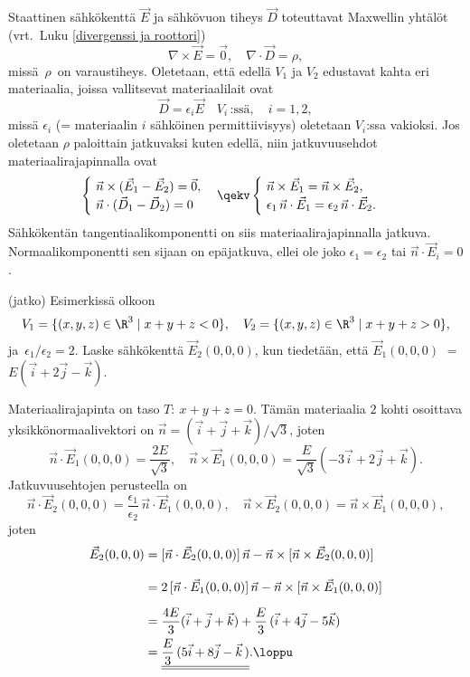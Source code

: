 \begin{Exa} Staattinen sähkökenttä $\vec E$ ja sähkövuon tiheys $\vec D$ toteuttavat Maxwellin
yhtälöt (vrt.\ Luku \ref{divergenssi ja roottori})
\[ 
\nabla\times\vec E = \vec 0, \quad \nabla\cdot\vec D = \rho, 
\]
missä $\,\rho\,$ on varaustiheys. Oletetaan, että edellä $V_1$ ja $V_2$ edustavat kahta eri 
materiaalia, joissa vallitsevat materiaalilait ovat
\[ 
\vec D = \epsilon_i\vec E \quad V_i\,\text{:ssä}, \quad i=1,2, 
\]
missä $\epsilon_i$ (= materiaalin $i$ sähköinen permittiivisyys) oletetaan $V_i$:ssa vakioksi.
Jos oletetaan $\rho$ paloittain jatkuvaksi kuten edellä, niin jatkuvuusehdot 
materiaalirajapinnalla ovat
\[
\begin{cases} 
\ \vec n\times(\vec E_1-\vec E_2) = \vec 0, \\ \ \vec n\cdot(\vec D_1-\vec D_2) = 0 
\end{cases}
\qekv \begin{cases} 
      \ \vec n\times\vec E_1 = \vec n\times\vec E_2, \\ 
      \ \epsilon_1\,\vec n\cdot\vec E_1 = \epsilon_2\,\vec n\cdot\vec E_2.
      \end{cases}
\]
Sähkökentän tangentiaalikomponentti on siis materiaalirajapinnalla jatkuva. Normaalikomponentti
sen sijaan on epäjatkuva, ellei ole joko $\epsilon_1 = \epsilon_2$ tai $\vec n\cdot\vec E_i=0$.
\loppu
\end{Exa}
\jatko \begin{Exa} (jatko) Esimerkissä olkoon 
\[ 
V_1 = \{(x,y,z) \in \R^3 \mid x+y+z<0\}, \quad V_2 = \{(x,y,z) \in \R^3 \mid x+y+z>0\}, 
\]
ja $\,\epsilon_1/\epsilon_2=2$. Laske sähkökenttä $\vec E_2(0,0,0)$, kun tiedetään, että 
$\vec E_1(0,0,0)$ $=$ $E(\vec i+2\vec j-\vec k)$.
\end{Exa}
\ratk Materiaalirajapinta on taso $T:\ x+y+z=0$. Tämän materiaalia $2$ kohti osoittava 
yksikkönormaalivektori on $\vec n = (\vec i+\vec j+\vec k)/\sqrt{3}$, joten
\[
\vec n\cdot\vec E_1(0,0,0) = \frac{2E}{\sqrt{3}}, \quad \vec n\times\vec E_1(0,0,0) 
                           = \frac{E}{\sqrt{3}}(-3\vec i+2\vec j+\vec k).
\]
Jatkuvuusehtojen perusteella on
\[ 
\vec n\cdot\vec E_2(0,0,0) = \frac{\epsilon_1}{\epsilon_2}\,\vec n\cdot\vec E_1(0,0,0), \quad
\vec n\times\vec E_2(0,0,0)=\vec n\times\vec E_1(0,0,0), 
\]
joten
\begin{align*}
\vec E_2(0,0,0) &=[\vec n\cdot\vec E_2(0,0,0)]\,\vec n
                            -\vec n\times[\vec n\times\vec E_2(0,0,0)] \\[3mm]
                &= 2\,[\vec n\cdot\vec E_1(0,0,0)]\,\vec n 
                            - \vec n\times[\vec n\times\vec E_1(0,0,0)] \\[2mm]
                &= \frac{4E}{3}(\vec i+\vec j+\vec k) + \frac{E}{3}\,(\vec i+4\vec j-5\vec k) \\
                &= \underline{\underline{\frac{E}{3}\,(5\vec i + 8\vec j - \vec k\,)}}. \loppu
\end{align*}


